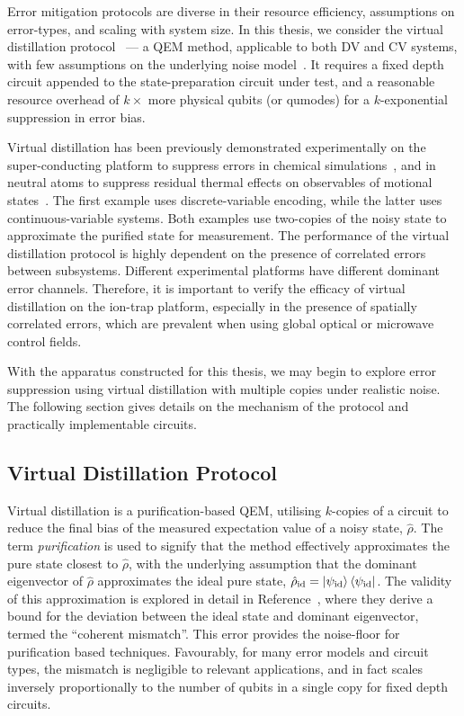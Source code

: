 Error mitigation protocols are diverse in their resource efficiency, assumptions
on error-types, and scaling with system size. In this thesis, we consider the
virtual distillation
protocol~\cite{cotler_quantum_2019,koczor_exponential_2021,huggins_virtual_2021} ---
a QEM method, applicable to both DV and
CV systems, with few assumptions on the underlying noise
model~\cite{koczor_dominant_2021,foldager_can_2024}. It requires a fixed depth
circuit appended to the state-preparation circuit under test, and a reasonable
resource overhead of $k\times$ more physical qubits (or qumodes) for a
$k$-exponential suppression in error bias. 

Virtual distillation has been previously demonstrated experimentally on the super-conducting platform to suppress errors in chemical simulations~\cite{obrien_purification-based_2023}, and in neutral atoms to suppress residual thermal effects on observables of motional states~\cite{cotler_quantum_2019}. The first example uses discrete-variable encoding, while the latter uses continuous-variable systems. Both examples use two-copies of the noisy state to approximate the purified state for measurement. The performance of the virtual distillation protocol is highly dependent on the presence of correlated errors between subsystems. Different experimental platforms have different dominant error channels. Therefore, it is important to verify the efficacy of virtual distillation on the ion-trap platform, especially in the presence of spatially correlated errors, which are prevalent when using global optical or microwave control fields.

With the apparatus constructed for this
thesis, we may begin to explore error suppression using virtual distillation with multiple copies under realistic noise. The following section gives
details on the mechanism of the protocol and practically implementable circuits.

\subsection{Virtual Distillation Protocol}
\label{sec:vir_dist_theory}
Virtual distillation is a purification-based QEM, utilising $k$-copies of a
circuit to reduce the final bias of the measured expectation value of a noisy
state, $\hat\rho$. The term \textit{purification} is used to signify that the method
effectively approximates the pure state closest to $\hat\rho$, with the underlying
assumption that the dominant eigenvector of $\hat\rho$ approximates the ideal pure
state, $\hat\rho_\mathrm{id}=\ket{\psi_\mathrm{id}}\bra{\psi_\mathrm{id}}$. 
The validity of this approximation is explored in detail in
Reference~\cite{koczor_dominant_2021}, where they derive a bound for the
deviation between the ideal state and dominant eigenvector, termed the
``coherent mismatch''. This error provides the noise-floor for purification
based techniques. Favourably, for many error models and circuit types, the mismatch is
negligible to relevant applications, and in fact scales inversely proportionally
to the number of qubits in a single copy for fixed depth circuits.

